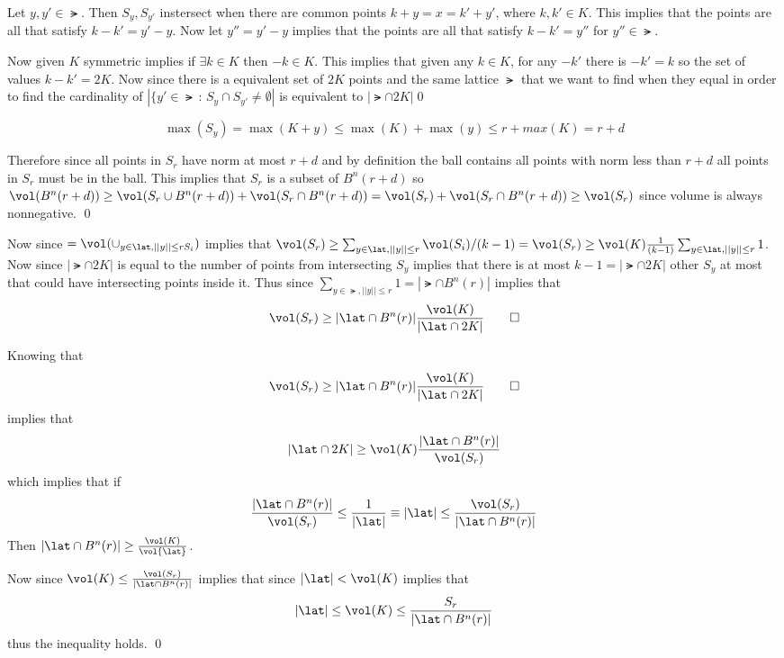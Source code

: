 \documentclass[12pt]{amsart}
\begin{document}
  \begin{problem}
    \begin{subproblem} 
      Let $y,y'\in \lat$. Then $S_y, S_{y'}$ instersect when there are common points $k+y=x=k'+y'$, where $k,k'\in K$. This implies that the points are all that satisfy $k-k'=y'-y$. Now let $y'' = y'-y$ implies that the points are all that satisfy $k-k'= y''$ for $y''\in \lat$. 

    Now given $K$ symmetric implies if $\exists k\in K$ then $-k\in K$. This implies that given any $k\in K$, for any $-k'$ there is $-k'=k$ so the set of values $k-k' = 2K$. Now since there is a equivalent set of $2K$ points and the same lattice $\lat$ that we want to find when they equal in order to find the cardinality of $|\{y'\in \lat\,:\,S_y\cap S_{y'}\neq \emptyset|$ is equivalent to $|\lat \cap 2K|$\qed
    \end{subproblem}
    \begin{subproblem}
      \[\max(S_y) = \max(K + y) \leq \max(K) + \max(y) \leq  r + max(K) = r+d\] 

      Therefore since all points in $S_r$ have norm at most $r+d$ and by definition the ball contains all points with norm less than $r+d$ all points in $S_r$ must be in the ball. This implies that $S_r$ is a subset of $B^n(r+d)$ so $\vol(B^n(r+d)) \geq \vol(S_r \cup B^n(r+d)) + \vol(S_r\cap B^n(r+d)) = \vol(S_r) + \vol(S_r\cap B^n(r+d)) \geq \vol(S_r)$ since volume is always nonnegative. \qed 
    \end{subproblem}
    \begin{subproblem}
      Now since $ = \vol(\cup_{y\in \lat, ||y||\leq r S_i})$ implies that $\vol(S_r) \geq \sum_{y\in\lat, ||y||\leq r}\vol(S_i)/(k-1) = \vol(S_r) \geq \vol(K) \frac{1}{(k-1)}\sum_{y\in\lat, ||y||\leq r}1$. Now since $|\lat \cap 2K|$ is equal to the number of points from intersecting $S_y$ implies that there is at most $k-1 = |\lat \cap 2K|$ other $S_y$ at most that could have intersecting points inside it. Thus since $\sum_{y\in\lat,||y||\leq r}1 = |\lat \cap B^n(r)|$ implies that 
      \[\vol(S_r) \geq |\lat \cap B^n(r)| \frac{\vol(K)}{|\lat \cap 2K|}\qed\]
    \end{subproblem}
    \begin{subproblem}
       Knowing that 
       \[\vol(S_r) \geq |\lat \cap B^n(r)| \frac{\vol(K)}{|\lat \cap 2K|}\qed\]
       implies that 
       \[|\lat \cap 2K| \geq \vol(K)\frac{|\lat \cap B^n(r)|}{\vol(S_r)}\] 
       which implies that if
       \[\frac{|\lat\cap B^n(r)|}{\vol(S_r)} \leq \frac{1}{|\lat|}\equiv |\lat| \leq \frac{\vol(S_r)}{|\lat \cap B^n(r)|}\] 
       Then $|\lat \cap B^n(r)| \geq \frac{\vol(K)}{\vol{\lat}}$. 

       Now since $\vol(K) \leq \frac{\vol(S_r)}{|\lat\cap B^n(r)|}$ implies that since $|\lat| < \vol(K)$ implies that 
       \[|\lat| \leq \vol(K)\leq \frac{S_r}{|\lat\cap B^n(r)|}\]
       thus the inequality holds. \qed
    \end{subproblem}
  \end{problem}
\end{document}
